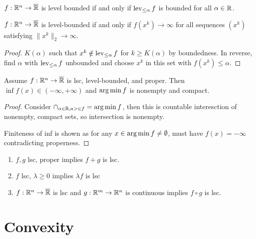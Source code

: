 \begin{defn}
  \label{sec:existence-9}
  $f: \mathbb{R}^{n} \rightarrow \overline {\mathbb{R}}$ is level bounded if and only if
  $\operatorname*{lev}_{\leq \alpha} f$ is bounded for all $\alpha \in \mathbb{R}$.
\end{defn}

\begin{thm}
  \label{sec:existence-10}
  $f: \mathbb{R}^{n} \rightarrow \overline {\mathbb{R}}$ is level-bounded if and only if
  $f(x^{k}) \rightarrow \infty$ for all sequences $(x^{k})$ satisfying
  $\| x^{k} \|_{2} \rightarrow \infty$.
\end{thm}

\begin{proof}
  $K(\alpha)$ such that $x^{k} \notin \operatorname*{lev}_{\leq \alpha} f$  for $k
  \geq K(\alpha)$ by boundedness. In reverse, find $\alpha$ with $\operatorname*{lev}
 _{\leq \alpha} f $ unbounded and choose $x^{k}$ in this set with
 $f(x^{k}) \leq \alpha$.
\end{proof}

\begin{thm}
  \label{sec:existence-11}
  Assume $f: \mathbb{R}^{n} \rightarrow \overline {\mathbb{R}}$ is lsc, level-bounded,
  and proper.  Then $\inf f(x) \in (-\infty, +\infty)$ and $\operatorname*{arg\,min} f$
  is nonempty and compact.
\end{thm}

\begin{proof}
  Consider $\cap_{\alpha \in \mathbb{R}, a > \in f} = \operatorname*{arg\,min} f$, then this is
  countable interesction of nonempty, compact sets, so intersection is
  nonempty.

  Finiteness of inf is shown as for any $x \in \operatorname*{arg\,min} f \neq
  \emptyset$, must have $f(x) = -\infty$ contradicting properness.
\end{proof}

\begin{thm}
  \label{sec:existence-12}
  \begin{enumerate}
  \item $f, g$ lsc, proper implies $f + g$ is lsc.
  \item $f$ lsc, $\lambda \geq 0$ implies $\lambda f$ is lsc
  \item $f: \mathbb{R}^{n} \rightarrow \overline {\mathbb{R}}$ is lsc and $g: \mathbb{R}^{m}
    \rightarrow \mathbb{R}^{n}$ is continuous implies $f \circ g$ is lsc.
  \end{enumerate}
\end{thm}

\section{Convexity}
\label{sec:convexity}

